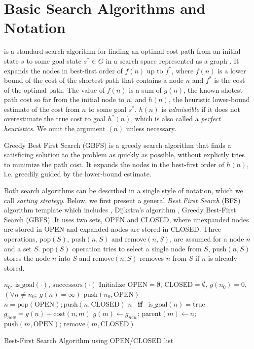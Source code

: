 
\section{Basic Search Algorithms and Notation}

\astar is a standard search algorithm for finding an optimal cost path from an initial state $s$ to some goal
state $s^* \in G$ in a search space represented as a graph \cite{hart1968formal}.
It expands the nodes in best-first order of $f(n)$ up to $f^*$,
where $f(n)$ is a lower bound of the cost of the shortest path that contains a node $n$ and $f^*$ is the cost of the optimal path.
The value of $f(n)$ is a sum of $g(n)$, the known shotest path cost so far from the initial node to $n$,
and $h(n)$, the heuristic lower-bound estimate of the cost from $n$ to some goal $s^*$.
% 
$h(n)$ is \emph{admissible} if it does not overestimate the true cost to
goal $h^*(n)$, which is also called a \emph{perfect heuristics}.
We omit the argument $(n)$ unless necessary.

Greedy Best First Search (GBFS) is a greedy search algorithm that finds
a satisficing solution to the problem as quickly as possible, without
explictly tries to minimize the path cost.  It expands the nodes in the
best-first order of $h(n)$, i.e. greedily guided by the
lower-bound estimate.

Both search algorithms can be described in a single style of notation, which we call \emph{sorting strategy}.
Below, we first present a general \emph{Best First Search} (BFS) algorithm template which includes  \astar, Dijkstra's algorithm \citeyear{dijkstra1959note}, Greedy Best-First Search (GBFS).
It uses two sets, OPEN and CLOSED, where unexpanded nodes are stored in OPEN and expanded nodes are stored in CLOSED. Three operations, pop$(S)$, push$(n,S)$ and remove$(n,S)$, are assumed for a node $n$ and a set $S$.
pop$(S)$ operation tries to select a single node from $S$,
push$(n,S)$ stores the node $n$ into $S$ and remove$(n,S)$ removes $n$ from $S$ if $n$ is already stored.

\begin{algorithm}                      
\begin{algorithmic}[1]
 \REQUIRE $n_0$, $\text{is\_goal}(\cdot)$, $\text{successors}(\cdot)$ %
 \STATE Initialize $\text{OPEN}=\emptyset$, $\text{CLOSED}=\emptyset$, $g(n_0)=0$, $\left(\forall n\not=n_0;\ g(n)=\infty\right)$
 \STATE $\text{push}(n_0,\text{OPEN})$
 \STATE $n = \text{pop}(\text{OPEN}); \text{push}(n,\text{CLOSED})$
 \RETURN $n$ \  \textbf{if} \  $\text{is\_goal}(n)=\text{true}$
 \STATE $g_{new} = g(n) + \text{cost}(n,m)$
 \STATE $g(m) \leftarrow g_{new}$;\; $\text{parent}(m) \leftarrow n$;\; $\text{push}(m,\text{OPEN})$;\; $\text{remove}(m,\text{CLOSED})$
 \ENDIF
 \ENDFOR
 \ENDWHILE
\end{algorithmic}
\caption{Best-First Search Algorithm using OPEN/CLOSED list}
\label{alg:ocl}
\end{algorithm}

